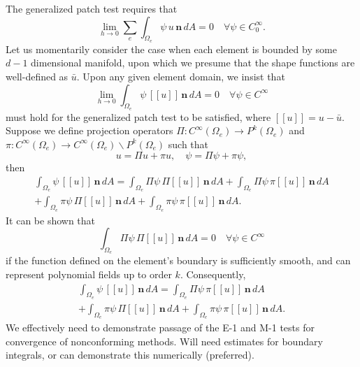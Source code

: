 The generalized patch test requires that
\begin{equation}
	\lim_{h \rightarrow 0} \sum_e \int_{\Omega_e} \psi \, u \, \mathbf{n} \, dA = 0 \quad \forall \psi \in C^\infty_0.
\end{equation}
Let us momentarily consider the case when each element is bounded by some $d-1$ dimensional manifold, upon which we presume that the shape functions are well-defined as $\bar{u}$. Upon any given element domain, we insist that
\begin{equation}
	\lim_{h \rightarrow 0} \int_{\Omega_e} \psi \, [\![ u ]\!] \, \mathbf{n} \, dA = 0 \quad \forall \psi \in C^\infty
\end{equation}
must hold for the generalized patch test to be satisfied, where $[\![ u ]\!] = u - \bar{u}$. Suppose we define projection operators $\Pi : C^\infty(\Omega_e) \rightarrow P^k (\Omega_e)$ and $\pi : C^\infty(\Omega_e) \rightarrow C^\infty(\Omega_e) \backslash P^k (\Omega_e)$ such that
\begin{equation}
	u = \Pi u + \pi u, \quad \psi = \Pi \psi + \pi \psi,
\end{equation}
then
\begin{eqnarray}
	\int_{\Omega_e} \psi \, [\![ u ]\!] \, \mathbf{n} \, dA = \int_{\Omega_e} \Pi \psi \, \Pi [\![ u ]\!] \, \mathbf{n} \, dA + \int_{\Omega_e} \Pi \psi \, \pi [\![ u ]\!] \, \mathbf{n} \, dA \\ + \int_{\Omega_e} \pi \psi \, \Pi [\![ u ]\!] \, \mathbf{n} \, dA +
\int_{\Omega_e} \pi \psi \, \pi [\![ u ]\!] \, \mathbf{n} \, dA.
\end{eqnarray}
It can be shown that
\begin{equation}
	\int_{\Omega_e} \Pi \psi \, \Pi [\![ u ]\!] \, \mathbf{n} \, dA = 0 \quad \forall \psi \in C^\infty
\end{equation}
if the function defined on the element's boundary is sufficiently smooth, and can represent polynomial fields up to order $k$. Consequently,
\begin{eqnarray}
	\int_{\Omega_e} \psi \, [\![ u ]\!] \, \mathbf{n} \, dA = \int_{\Omega_e} \Pi \psi \, \pi [\![ u ]\!] \, \mathbf{n} \, dA \\ + \int_{\Omega_e} \pi \psi \, \Pi [\![ u ]\!] \, \mathbf{n} \, dA +
\int_{\Omega_e} \pi \psi \, \pi [\![ u ]\!] \, \mathbf{n} \, dA.
\end{eqnarray}
We effectively need to demonstrate passage of the E-1 and M-1 tests for convergence of nonconforming methods. Will need estimates for boundary integrals, or can demonstrate this numerically (preferred).


